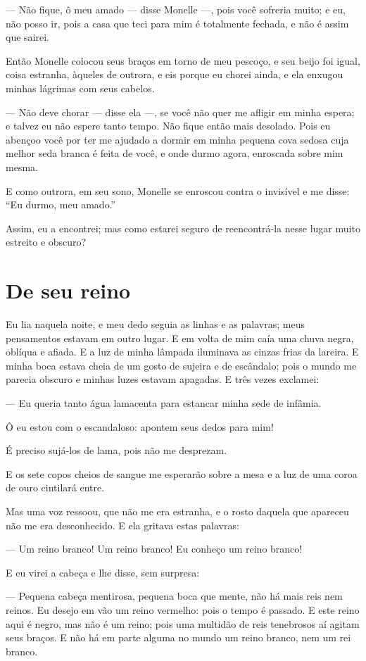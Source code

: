 --- Não fique, ô meu amado --- disse Monelle ---, pois você sofreria muito; e
eu, não posso ir, pois a casa que teci para mim é totalmente fechada, e
não é assim que sairei.

Então Monelle colocou seus braços em torno de meu pescoço, e seu beijo
foi igual, coisa estranha, àqueles de outrora, e eis porque eu chorei
ainda, e ela enxugou minhas lágrimas com seus cabelos.

--- Não deve chorar --- disse ela ---, se você não quer me afligir em minha
espera; e talvez eu não espere tanto tempo. Não fique então mais desolado.
Pois eu abençoo você por ter me ajudado a dormir em minha pequena cova
sedosa cuja melhor seda branca é feita de você, e onde durmo agora,
enroscada sobre mim mesma.

E como outrora, em seu sono, Monelle se enroscou contra o invisível e
me disse: “Eu durmo, meu amado.”

Assim, eu a encontrei; mas como estarei seguro de reencontrá-la nesse
lugar muito estreito e obscuro?

\section{De seu reino}

Eu lia naquela noite, e meu dedo seguia as linhas e as palavras; meus
pensamentos estavam em outro lugar. E em volta de mim caía uma chuva
negra, oblíqua e afiada. E a luz de minha lâmpada iluminava as cinzas
frias da lareira. E minha boca estava cheia de um gosto de sujeira e de
escândalo; pois o mundo me parecia obscuro e minhas luzes estavam
apagadas. E três vezes exclamei:

--- Eu queria tanto água lamacenta para estancar minha sede de infâmia.

Ô eu estou com o escandaloso: apontem seus dedos para mim!

É preciso sujá-los de lama, pois não me desprezam.

E os sete copos cheios de sangue me esperarão sobre a mesa e a luz de
uma coroa de ouro cintilará entre.

Mas uma voz ressoou, que não me era estranha, e o rosto daquela que
apareceu não me era desconhecido. E ela gritava estas palavras:

--- Um reino branco! Um reino branco! Eu conheço um reino branco!

E eu virei a cabeça e lhe disse, sem surpresa:

--- Pequena cabeça mentirosa, pequena boca que mente, não há mais reis
nem reinos. Eu desejo em vão um reino vermelho: pois o tempo é passado. E
este reino aqui é negro, mas não é um reino; pois uma multidão de reis
tenebrosos aí agitam seus braços. E não há em parte alguma no mundo um
reino branco, nem um rei branco.

